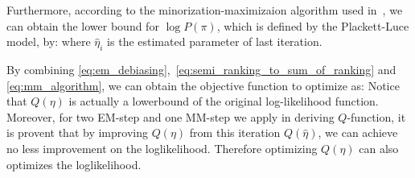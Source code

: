 

Furthermore, according to the minorization-maximizaion algorithm used in~\cite{hunter:aos2004}, 
we can obtain the lower bound for $\log P(\pi)$, which is defined by the Plackett-Luce model, by:
%
where $\hat{\eta}_i$ is the estimated parameter of last iteration.  



By combining \eqref{eq:em_debiasing},~\eqref{eq:semi_ranking_to_sum_of_ranking} and \eqref{eq:mm_algorithm}, 
we can obtain the objective function to optimize as:
%
Notice that $Q(\eta)$ is actually a lowerbound of the original log-likelihood function.  
Moreover, for two EM-step and one MM-step we apply in deriving $Q$-function, 
it is provent that by improving $Q(\eta)$ from this iteration $Q(\hat{\eta})$, 
we can achieve no less improvement on the loglikelihood.  
Therefore optimizing $Q(\eta)$ can also optimizes the loglikelihood.  



